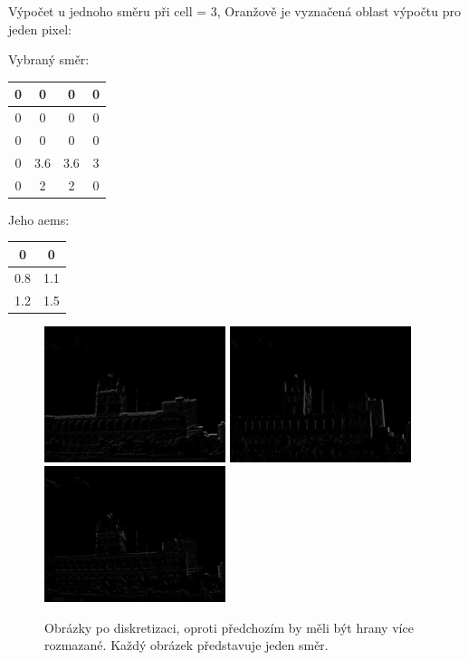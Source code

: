 \documentclass{report}
\begin{document}
Výpočet u jednoho směru při cell = 3, Oranžově je vyznačená oblast výpočtu pro jeden pixel:
\begin{multicols}{2}
	Vybraný směr:
 	\begin{center}
  		\begin{tabular}{ | c | c | c | c | }
    		\hline
    		0 & 0 & 0 & 0 \\ \hline
    		\cellcolor{orange!50}0 & \cellcolor{orange!50}0 & \cellcolor{orange!50}0 & 0 \\ \hline
    		\cellcolor{orange!50}0 & \cellcolor{orange!50}0 & \cellcolor{orange!50}0 & 0 \\ \hline
    		\cellcolor{orange!50}0 & \cellcolor{orange!50}3.6 & \cellcolor{orange!50}3.6 & 3 \\ \hline
    		0 & 2 & 2 & 0 \\
    		\hline
  		\end{tabular}
  	\end{center}
  	Jeho aems: 
  	\begin{center}
  		\begin{tabular}{ | c | c | }
    		\hline
    		0 & 0 \\ \hline
    		\cellcolor{orange!50}0.8 & 1.1 \\ \hline
    		1.2 & 1.5 \\
    		\hline
  		\end{tabular}
  	\end{center} 	
\end{multicols}

\begin{figure}[H]
	\centering
	\includegraphics[width=150pt]{./img/aems0.jpg}
	\includegraphics[width=150pt]{./img/aems1.jpg}
	\includegraphics[width=150pt]{./img/aems2.jpg}
	\caption{Obrázky po diskretizaci, oproti předchozím by měli být hrany více rozmazané. Každý obrázek představuje jeden směr.}
\end{figure}
\end{document}
